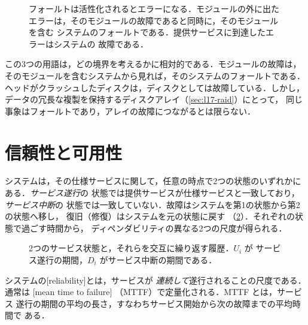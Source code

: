 \documentclass[../main.tex]{subfiles}
\begin{document}
\begin{figure}[htbp]
  \centering
  
  \caption{フォールトは活性化されるとエラーになる．モジュールの外に出た
    エラーは，そのモジュールの故障であると同時に，そのモジュールを含む
    システムのフォールトである．提供サービスに到達したエラーはシステムの
    故障である．}
  \label{fig:l17-fault-chain}
\end{figure}

この3つの用語は，どの境界を考えるかに相対的である．モジュールの故障は，
そのモジュールを含むシステムから見れば，そのシステムのフォールトである．
ヘッドがクラッシュしたディスクは，ディスクとしては故障している．しかし，
データの冗長な複製を保持するディスクアレイ（\cref{sec:l17-raid}）にとって，
同じ事象はフォールトであり，アレイの故障につながるとは限らない．

\section{信頼性と可用性}
\label{sec:l17-reliability}

システムは，その仕様サービスに関して，任意の時点で2つの状態のいずれかに
ある．\emph{サービス遂行}の
状態では提供サービスが仕様サービスと一致しており，\emph{サービス中断}の
状態では一致していない．故障はシステムを第1の状態から第2の状態へ移し，
復旧（修復）はシステムを元の状態に戻す
（\cref{fig:l17-service-timeline}）．それぞれの状態で過ごす時間から，
ディペンダビリティの異なる2つの尺度が得られる．

\begin{figure}[htbp]
  \centering
  
  \caption{2つのサービス状態と，それらを交互に繰り返す履歴．$U_i$ が
    サービス遂行の期間，$D_i$ がサービス中断の期間である．}
  \label{fig:l17-service-timeline}
\end{figure}

\begin{definition}[信頼性]
  システムの[reliability]とは，サービスが
  \emph{連続して}遂行されることの尺度である．通常は
  [mean time to failure]%
  （MTTF）で定量化される．MTTF とは，サービス
  遂行の期間の平均の長さ，すなわちサービス開始から次の故障までの平均時間で
  ある．
\end{definition}
\end{document}
